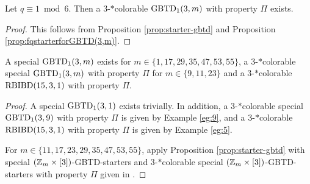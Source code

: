 \documentclass[draft, 11pt]{article}
\begin{document}
 
\begin{corollary}\label{cor:fqgbtd} Let $q\equiv 1\bmod 6$. Then a $3$-$*$colorable ${\rm GBTD}_1(3,m)$ with property $\Pi$ exists.
\end{corollary}

\begin{proof}
This follows from Proposition \ref{prop:starter-gbtd} and
Proposition \ref{prop:fqstarterforGBTD(3,m)}.
\end{proof}

 
\begin{corollary}
\label{cor:smallgbtd}
A special ${\rm GBTD}_1(3,m)$ exists for
$m\in\{1,17,29,35,47,53,55\}$, a $3$-$*$colorable special ${\rm GBTD}_1(3,m)$ with property $\Pi$ for $m\in\{9,11,23\}$
and a $3$-$*$colorable
${\rm RBIBD}(15,3,1)$ with property $\Pi$.
\end{corollary}

\begin{proof}
A special ${\rm GBTD}_1(3,1)$ exists trivially.
In addition, a $3$-$*$colorable special ${\rm GBTD}_1(3,9)$ with property $\Pi$ is given by Example \ref{eg:9}, and
a $3$-$*$colorable $\textrm{RBIBD}(15,3,1)$ with property $\Pi$ is given by Example \ref{eg:5}.

For $m\in\{11,17,23,29,35,47,53,55\}$, apply Proposition \ref{prop:starter-gbtd} with special $(\mathbb Z_m\times[3])$-GBTD-starters
and $3$-$*$colorable special $(\mathbb Z_m\times[3])$-GBTD-starters with property $\Pi$
given in \cite{Cheeetal:2012online}.
\end{proof}
\end{document}
